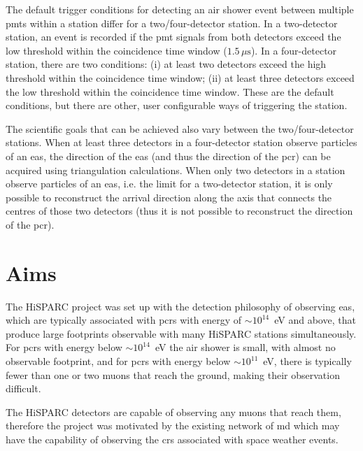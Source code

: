 The default trigger conditions for detecting an air shower event between multiple \glspl{pmt} within a station differ for a two/four-detector station. In a two-detector station, an event is recorded if the \gls{pmt} signals from both detectors exceed the low threshold within the coincidence time window ($1.5 \, \mu\mathrm{s}$). In a four-detector station, there are two conditions: (i) at least two detectors exceed the high threshold within the coincidence time window; (ii) at least three detectors exceed the low threshold within the coincidence time window. These are the default conditions, but there are other, user configurable ways of triggering the station.

The scientific goals that can be achieved also vary between the two/four-detector stations. When at least three detectors in a four-detector station observe particles of an \gls{eas}, the direction of the \gls{eas} (and thus the direction of the \gls{pcr}) can be acquired using triangulation calculations. When only two detectors in a station observe particles of an \gls{eas}, i.e. the limit for a two-detector station, it is only possible to reconstruct the arrival direction along the axis that connects the centres of those two detectors (thus it is not possible to reconstruct the direction of the \gls{pcr}).




\section{Aims}\label{sec:HS_aims}
The HiSPARC project was set up with the detection philosophy of observing \gls{eas}, which are typically associated with \gls{pcr}s with energy of $\sim10^{14}$~eV and above, that produce large footprints observable with many HiSPARC stations simultaneously. For \gls{pcr}s with energy below $\sim10^{14}$~eV the air shower is small, with almost no observable footprint, and for \gls{pcr}s with energy below $\sim10^{11}$~eV, there is typically fewer than one or two muons that reach the ground, making their observation difficult. 

The HiSPARC detectors are capable of observing any muons that reach them, therefore the project was motivated by the existing network of \gls{md} which may have the capability of observing the \gls{cr}s associated with space weather events.

